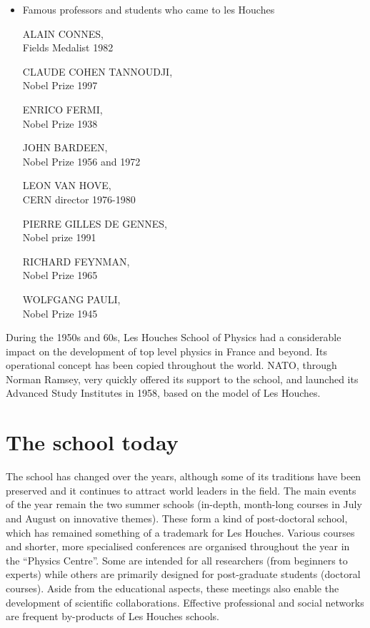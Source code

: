 \begin{itemize}
\begin{multicols}{2}
{KG Wilson,
came to les Houches in 1975. Nobel prize in 1982.

E. Witten,
came to les Houches. Fields Medalist in 1990.

C.N. Yang,
came to les Houches in 1957. Nobel prize in 1958.
}
\end{multicols}

\item  Famous professors and students who came to les Houches
\begin{multicols}{2}

ALAIN CONNES,\\
Fields Medalist 1982
 
CLAUDE COHEN TANNOUDJI,\\
Nobel Prize 1997
 
ENRICO FERMI,\\
Nobel Prize 1938
 
JOHN BARDEEN,\\
Nobel Prize 1956 and 1972
 
LEON VAN HOVE,\\
CERN director 1976-1980
 
PIERRE GILLES DE GENNES,\\
Nobel prize 1991
 
RICHARD FEYNMAN,\\
Nobel Prize 1965
 
WOLFGANG PAULI,\\
Nobel Prize 1945
\end{multicols}


\end{itemize}

During the 1950s and 60s, Les Houches School of Physics had a considerable impact on the development of top level physics in France and beyond. Its operational concept has been copied throughout the world. NATO, through Norman Ramsey, very quickly offered its support to the school, and launched its Advanced Study Institutes in 1958, based on the model of Les Houches.

\section{The school today}

The school has changed over the years, although some of its traditions have been preserved and it continues to attract world leaders in the field. The main events of the year remain the two summer schools (in-depth, month-long courses in July and August on innovative themes). These form a kind of post-doctoral school, which has remained something of a trademark for Les Houches. Various courses and shorter, more specialised conferences are organised throughout the year in the “Physics Centre”. Some are intended for all researchers (from beginners to experts) while others are primarily designed for post-graduate students (doctoral courses). Aside from the educational aspects, these meetings also enable the development of scientific collaborations. Effective professional and social networks are frequent by-products of Les Houches schools.

